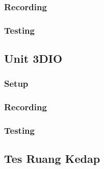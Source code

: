 \documentclass{article}
\begin{document}
	\subsubsection{Recording}

	\subsubsection{Testing}

	\subsection{Unit 3DIO}

	\subsubsection{Setup}

	\subsubsection{Recording}

	\subsubsection{Testing}

	\subsection{Tes Ruang Kedap}
\end{document}
